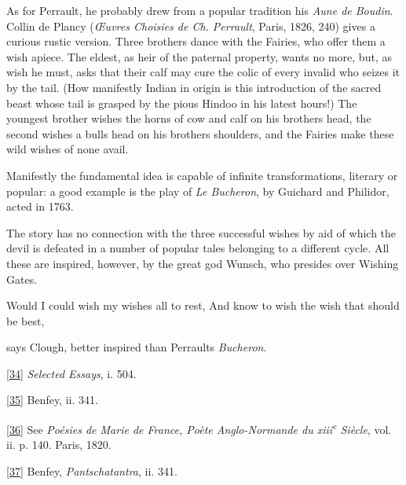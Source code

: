\documentclass[14pt,a4paper]{memoir}
\begin{document}
As for Perrault, he probably drew from a popular tradition his
\emph{Aune de Boudin}. Collin de Plancy (\emph{Œuvres Choisies de Ch.
Perrault}, Paris, 1826, 240) gives a curious rustic version. Three
brothers dance with the Fairies, who offer them a wish apiece. The
eldest, as heir of the paternal property, wants no more, but, as wish he
must, asks that their calf may cure the colic of every invalid who
seizes it by the tail. (How manifestly Indian in origin is this
introduction of the sacred beast whose tail is grasped by the pious
Hindoo in his latest hours!) The youngest brother wishes the horns of
cow and calf on his brother\textquotesingle s head, the second wishes a
bull\textquotesingle s head on his brother\textquotesingle s shoulders,
and the Fairies make these wild wishes of none avail.

Manifestly the fundamental idea is capable of infinite transformations,
literary or popular: a good example is the play of \emph{Le Bucheron},
by Guichard and Philidor, acted in 1763.

The story has no connection with the three successful wishes by aid of
which the devil is defeated in a number of popular tales belonging to a
different cycle. All these are inspired, however, by the great god
Wunsch, who presides over Wishing Gates.

{\textquotesingle Would I could wish my wishes all to rest,} {And know
to wish the wish that should be best,}

says Clough, better inspired than Perrault\textquotesingle s
\emph{Bucheron}.

\protect\hypertarget{4533318093929944247_33931-h-0.htm.xhtmlux5cux23Footnote_34}{}{}\protect\hyperlink{4533318093929944247_33931-h-0.htm.xhtmlux5cux23FNanchor_34}{{{[}34{]}}}
\emph{Selected Essays}, i. 504.

\protect\hypertarget{4533318093929944247_33931-h-0.htm.xhtmlux5cux23Footnote_35}{}{}\protect\hyperlink{4533318093929944247_33931-h-0.htm.xhtmlux5cux23FNanchor_35}{{{[}35{]}}}
Benfey, ii. 341.

\protect\hypertarget{4533318093929944247_33931-h-0.htm.xhtmlux5cux23Footnote_36}{}{}\protect\hyperlink{4533318093929944247_33931-h-0.htm.xhtmlux5cux23FNanchor_36}{{{[}36{]}}}
See \emph{Poésies de Marie de France, Poète Anglo-Normande du
xiii\textsuperscript{e} Siècle}, vol. ii. p. 140. Paris, 1820.

\protect\hypertarget{4533318093929944247_33931-h-0.htm.xhtmlux5cux23Footnote_37}{}{}\protect\hyperlink{4533318093929944247_33931-h-0.htm.xhtmlux5cux23FNanchor_37}{{{[}37{]}}}
Benfey, \emph{Pantschatantra}, ii. 341.
\end{document}
